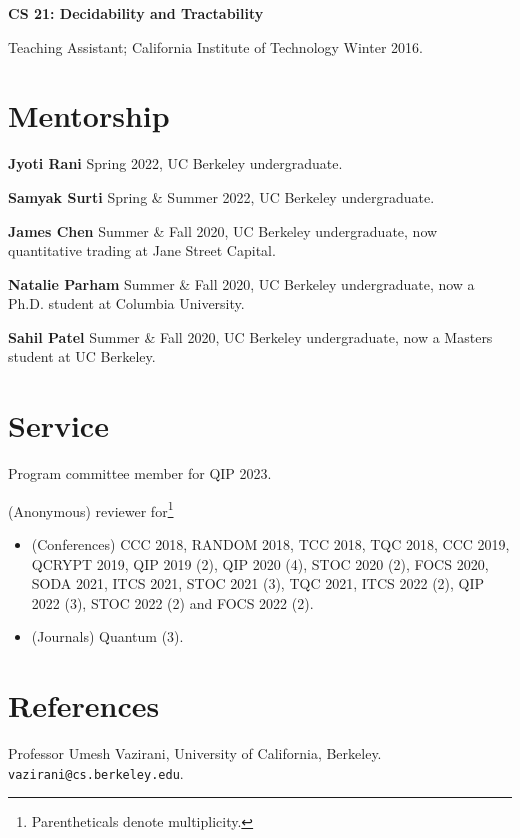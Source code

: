 \documentclass[11pt]{article}
\begin{document}
\textbf{CS 21: Decidability and Tractability}

Teaching Assistant; California Institute of Technology Winter 2016.




\section{Mentorship}
\textbf{Jyoti Rani}
Spring 2022, 
UC Berkeley undergraduate.

\textbf{Samyak Surti}
Spring \& Summer 2022,
UC Berkeley undergraduate.

\textbf{James Chen}
Summer \& Fall 2020,
UC Berkeley undergraduate, now quantitative trading at Jane Street Capital.

\textbf{Natalie Parham}
Summer \& Fall 2020,
UC Berkeley undergraduate, now a Ph.D. student at Columbia University.

\textbf{Sahil Patel} 
Summer \& Fall 2020,
UC Berkeley undergraduate, now a Masters student at UC Berkeley.

\section{Service}
Program committee member for QIP 2023.

(Anonymous) reviewer for\footnote{Parentheticals denote multiplicity.} 
\begin{itemize}
\item (Conferences) CCC 2018, RANDOM 2018, TCC 2018, TQC 2018, CCC 2019, QCRYPT 2019, QIP 2019 (2), QIP 2020 (4), STOC 2020 (2), FOCS 2020, SODA 2021, ITCS 2021, STOC 2021 (3), TQC 2021, ITCS 2022 (2), QIP 2022 (3), STOC 2022 (2) and FOCS 2022 (2).
\item (Journals) Quantum (3).
\end{itemize}


\section{References}
Professor Umesh Vazirani, University of California, Berkeley. \texttt{vazirani@cs.berkeley.edu}.
\end{document}
